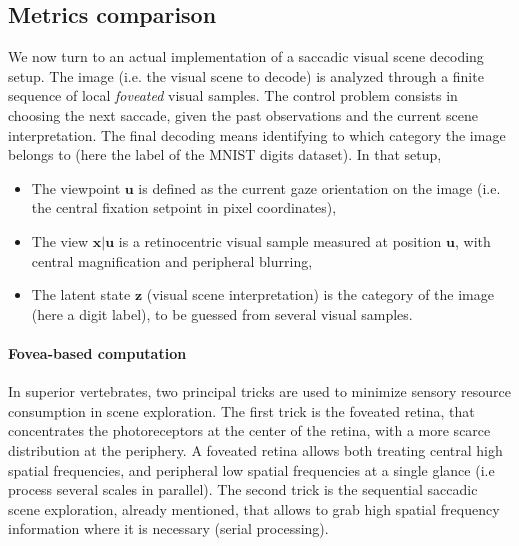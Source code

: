 \documentclass[12pt,twoside,openright]{article}
\begin{document}

% 
%
%
\subsection{Metrics comparison}

{\color{Purple} We now turn to an actual implementation of a saccadic visual scene decoding setup. The   image (i.e. the visual scene to decode) is analyzed through a finite sequence of local \emph{foveated} visual samples.  The control problem consists in choosing the next saccade, given the past observations and the current scene interpretation. The final decoding means identifying to which category the image belongs to (here the label of the MNIST digits dataset). 
	In that setup, 
	\begin{itemize}
		\item The viewpoint $\boldsymbol{u}$ is defined as the current gaze orientation on the image (i.e. the central fixation setpoint in pixel coordinates),
		\item The view $\boldsymbol{x}|\boldsymbol{u}$ is a retinocentric visual sample measured at position $\boldsymbol{u}$, with central magnification and peripheral blurring,
		\item The latent state $\boldsymbol{z}$ (visual scene interpretation) is the category of the image (here a digit label), to be guessed from several visual samples.
	\end{itemize} 
}

\paragraph{Fovea-based computation} 
In superior vertebrates, two principal tricks are used to minimize sensory resource consumption in scene exploration. The first trick is the foveated retina, that concentrates the photoreceptors at the center of the retina, with a more scarce distribution at the periphery. A foveated retina allows both treating central high spatial frequencies, and peripheral low spatial frequencies at a single glance (i.e process several scales in parallel). The second trick is the sequential saccadic scene exploration, already mentioned, that allows to grab high spatial frequency information where it is necessary (serial processing).
\end{document}
